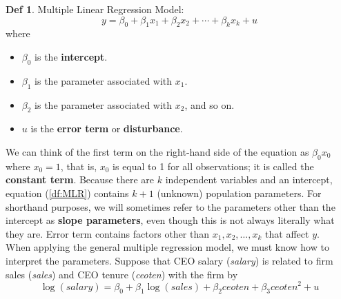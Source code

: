 \documentclass[a4paper, 10pt]{article}
\theoremstyle{definition}	%
\newtheorem*{definition}{Def}
\begin{document}
\begin{definition}
Multiple Linear Regression Model:
     \begin{equation}
         y = \beta_0 + \beta_1 x_1 + \beta_2 x_2 + \cdots + \beta_k x_k + u \label{df:MLR}
     \end{equation}
     where
    \begin{itemize}[label={}]
        \item $\beta_0$ is the \textbf{intercept}.
        \item $\beta_1$ is the parameter associated with $x_1$.
        \item $\beta_2$ is the parameter associated with $x_2$, and so on.
        \item $u$ is the \textbf{error term} or \textbf{disturbance}.
    \end{itemize}
\end{definition}
We can think of the first term on the right-hand side of the equation as $\beta_0 x_0$ where $x_0 = 1$, that is, $x_0$ is equal to 1 for all observations; it is called the \textbf{constant term}. Because there are $k$ independent variables and an intercept, equation (\ref{df:MLR}) contains $k + 1$ (unknown) population parameters. For shorthand purposes, we will sometimes refer to the parameters other than the intercept as \textbf{slope parameters}, even though this is not always literally what they are. Error term contains factors other than $x_1, x_2, \dots, x_k$ that affect $y$.\\
When applying the general multiple regression model, we must know how to interpret the parameters. Suppose that CEO salary (\textit{salary}) is related to firm sales (\textit{sales}) and CEO tenure (\textit{ceoten}) with the firm by
\begin{equation}
    \log(\textit{salary}) = \beta_0 + \beta_1 \log(\textit{sales}) + \beta_2 \textit{ceoten} + \beta_3 \textit{ceoten}^2 + u
    \label{example:1} 
\end{equation}
\end{document}

